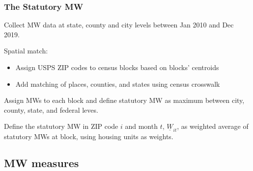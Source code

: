 \documentclass[aspectratio=169, t]{beamer}
\newcommand{\MW}{\underline{W}}
\begin{document}
\begin{frame}[label=stat_MW]
    \frametitle{The Statutory MW}
    
    Collect MW data at state, county and city levels between Jan 2010 and Dec 2019.
    
    \vspace{2mm}
    Spatial match:
    \begin{itemize}
        \item Assign USPS ZIP codes to census blocks based on blocks' centroids
        \item Add matching of places, counties, and states using census crosswalk
    \end{itemize}
    
    \vspace{2mm}
    Assign MWs to each block and define statutory MW as maximum between city, 
    county, state, and federal leves.
    
    \vspace{2mm}
    Define the statutory MW in ZIP code $i$ and month $t$, $\MW_{it}$, as weighted
    average of statutory MWs at block, using housing units as weights.

    \vspace{2mm}
    \hyperlink{dist_mw_changes}{}

    \hyperlink{mw_changes_map}{}
\end{frame}

\subsection{MW measures}
\end{document}
